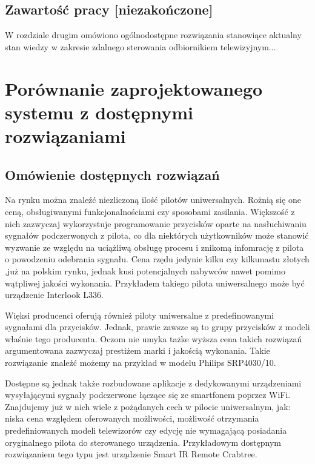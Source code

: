\documentclass[12pt,twoside]{article}
\begin{document}
\subsection{Zawartość pracy [niezakończone]}
W rozdziale drugim  omówiono ogólnodostępne rozwiązania stanowiące aktualny stan wiedzy w zakresie zdalnego sterowania odbiornikiem telewizyjnym...

\clearpage
\section{Porównanie zaprojektowanego systemu z do\-stęp\-ny\-mi rozwiązaniami}
\subsection{Omówienie dostępnych rozwiązań}
Na rynku można znaleźć niezliczoną ilość pilotów uniwersalnych. Rożnią się one
ceną, obsługiwanymi funkcjonalnościami czy sposobami zasilania. Większość z nich zazwyczaj
wykorzystuje programowanie przycisków oparte na nasłuchiwaniu sygnałów podczerwonych z pilota, co dla niektórych użytkowników może stanowić
wyzwanie ze względu na uciążliwą obsługę procesu i znikomą infomrację z pilota o powodzeniu odebrania sygnału. Cena rzędu jedynie kilku czy kilkunastu złotych
,już na polskim rynku, jednak kusi potencjalnych nabywców nawet pomimo wątpliwej jakości wykonania. Przykładem
takiego pilota uniwersalnego może być urządzenie Interlook L336\cite{cheapController}.

Więksi producenci oferują również piloty uniwersalne z predefinowanymi sygnałami dla przycisków. Jednak,
prawie zawsze są to grupy przycisków z modeli właśnie tego producenta. Oczom nie umyka tażke wyższa cena takich
rozwiązań argumentowana zazwyczaj prestiżem marki i jakością wykonania. Takie rozwiązanie znaleźć
możemy na przykład w modelu Philips SRP4030/10\cite{expensiveController}.

Dostępne są jednak także rozbudowane aplikacje z dedykowanymi urządzeniami wysyłającymi sygnały podczerwone łączące się ze smartfonem poprzez WiFi. Znajdujemy już w nich wiele z pożądanych cech w pilocie uniwersalnym, jak: niska cena względem oferowanych możliwości, możliwość otrzymania predefiniowanych modeli telewizorów czy edycję nie wymagającą posiadania oryginalnego pilota do sterowanego urządzenia. Przykładowym dostępnym rozwiązaniem tego typu jest urządzenie Smart IR Remote Crabtree\cite{appController}.
\end{document}
